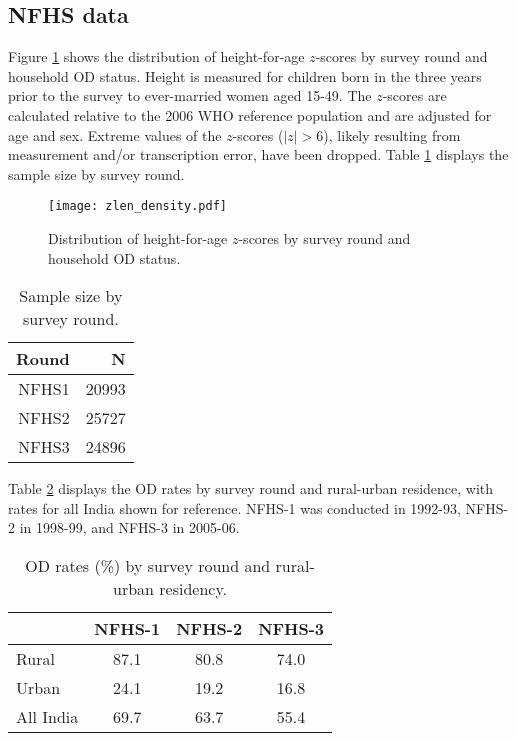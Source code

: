 \documentclass[12pt,a4paper,titlepage]{article}
\begin{document}
\begin{appendices}

\section{NFHS data}\label{sec:app_data}
Figure \ref{fig:zlen} shows the distribution of height-for-age $z$-scores by survey round and household OD status. Height is measured for children born in the three years prior to the survey to ever-married women aged 15-49. The $z$-scores are calculated relative to the 2006 WHO reference population and are adjusted for age and sex. Extreme values of the $z$-scores ($|z|>6$), likely resulting from measurement and/or transcription error, have been dropped. Table \ref{table:ss} displays the sample size by survey round.

\begin{figure}[h!]\label{fig:zlen}
	\centering
	\texttt{[image: zlen\_density.pdf]}
	\caption{Distribution of height-for-age $z$-scores by survey round and household OD status.}
\end{figure}

\begin{table}[ht]
\centering
\begin{tabular}{rr}
  \hline
 Round & N \\ 
  \hline
NFHS1 & 20993 \\ 
  NFHS2 & 25727 \\ 
  NFHS3 & 24896 \\ 
   \hline
\end{tabular}
\caption{Sample size by survey round.}
\label{table:ss}
\end{table}

Table \ref{table:nfhs_od} displays the OD rates by survey round and rural-urban residence, with rates for all India shown for reference. NFHS-1 was conducted in 1992-93, NFHS-2 in 1998-99, and NFHS-3 in 2005-06.

\begin{table}[h!]
	\small
	\centering
	\begin{tabular}{lccc}
		  & NFHS-1 & NFHS-2 & NFHS-3 \\
		 \hline
		 Rural & 87.1 & 80.8 & 74.0 \\
		 Urban & 24.1 & 19.2 & 16.8 \\
		 All India & 69.7 & 63.7 & 55.4 \\
		 \hline
	\end{tabular}
	\caption{OD rates (\%) by survey round and rural-urban residency.}
	\label{table:nfhs_od}
\end{table}


\end{appendices}
\end{document}
